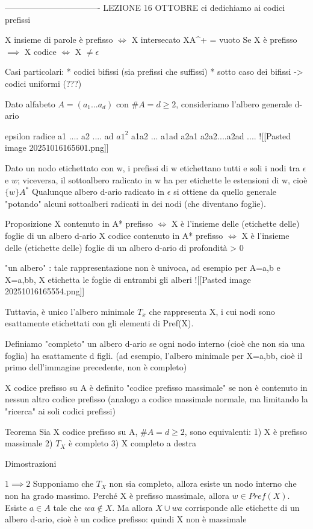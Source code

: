 
----------------------------------
LEZIONE 16 OTTOBRE
ci dedichiamo ai codici prefissi

X insieme di parole è prefisso $\iff$ X intersecato XA^+ = vuoto
Se X è prefisso $\implies$  X codice $\iff$ X $\neq {\epsilon}$

Casi particolari:
* codici bifissi (sia prefissi che suffissi)
* sotto caso dei bifissi -> codici uniformi (???)

Dato alfabeto $A=(a_1...a_d)$ con $\#A=d \ge 2$, consideriamo l'albero generale d-ario

epsilon radice
a1 ....                            a2 ....                          ad
$a1^2$ a1a2 ... a1ad     a2a1 a2a2....a2ad          ....
![[Pasted image 20251016165601.png]]

Dato un nodo etichettato con w, i prefissi di w etichettano tutti e soli i nodi tra $\epsilon$ e $w$; viceversa, il sottoalbero radicato in w ha per etichette le estensioni di w, cioè $\{w\}A^*$
Qualunque albero d-ario radicato in $\epsilon$ si ottiene da quello generale "potando" alcuni sottoalberi radicati in dei nodi (che diventano foglie).

Proposizione
X contenuto in A* prefisso $\iff$ X è l'insieme delle (etichette delle) foglie di un albero d-ario
X codice contenuto in A* prefisso $\iff$ X è l'insieme delle (etichette delle) foglie di un albero d-ario di profondità > 0

"un albero" : tale rappresentazione non è univoca, ad esempio per A={a,b} e X={a,bb}, X etichetta le foglie di entrambi gli alberi
![[Pasted image 20251016165554.png]]

Tuttavia, è unico l'albero minimale $T_x$ che rappresenta X, i cui nodi sono esattamente etichettati con gli elementi di Pref(X).

Definiamo "completo" un albero d-ario se ogni nodo interno (cioè che non sia una foglia) ha esattamente d figli.
(ad esempio, l'albero minimale per X={a,bb}, cioè il primo dell'immagine precedente, non è completo)

X codice prefisso su A è definito "codice prefisso massimale" se non è contenuto in nessun altro codice prefisso (analogo a codice massimale normale, ma limitando la "ricerca" ai soli codici prefissi)

Teorema
Sia X codice prefisso su A, $\#A=d \ge 2$, sono equivalenti:
1) X è prefisso massimale
2) $T_X$ è completo
3) X completo a destra

Dimostrazioni

$1\implies 2$
Supponiamo che $T_X$ non sia completo, allora esiste un nodo interno che non ha grado massimo.
Perché X è prefisso massimale, allora $w \in Pref(X)$.
Esiste $a \in A$ tale che $wa \notin X$.
Ma allora $X\cup {wa}$ corrisponde alle etichette di un albero d-ario, cioè è un codice prefisso: quindi X non è massimale
 
